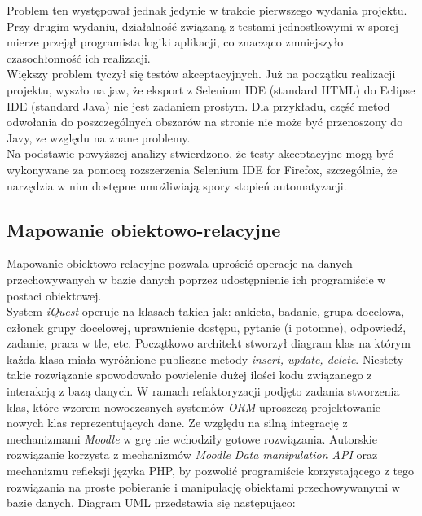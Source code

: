 Problem ten występował jednak jedynie w trakcie pierwszego wydania projektu. Przy drugim wydaniu, działalność związaną z testami jednostkowymi w sporej mierze przejął programista logiki aplikacji, co znacząco zmniejszyło czasochłonność ich realizacji. \\

Większy problem tyczył się testów akceptacyjnych. Już na początku realizacji projektu, wyszło na jaw, że eksport z Selenium IDE (standard HTML) do Eclipse IDE (standard Java) nie jest zadaniem prostym. Dla przykładu, część metod odwołania do poszczególnych obszarów na stronie nie może być przenoszony do Javy, ze względu na znane problemy. \\

Na podstawie powyższej analizy stwierdzono, że testy akceptacyjne mogą być wykonywane za pomocą rozszerzenia Selenium IDE for Firefox, szczególnie, że narzędzia w nim dostępne umożliwiają spory stopień automatyzacji.

\subsection{Mapowanie obiektowo-relacyjne}
\label{Chapter62c}

Mapowanie obiektowo-relacyjne pozwala uprościć operacje na danych przechowywanych w bazie danych poprzez udostępnienie ich programiście w postaci obiektowej. \\

System \emph{iQuest} operuje na klasach takich jak: ankieta, badanie, grupa docelowa, członek grupy docelowej, uprawnienie dostępu, pytanie (i potomne), odpowiedź, zadanie, praca w tle, etc. Początkowo architekt stworzył diagram klas na którym każda klasa miała wyróżnione publiczne metody \emph{insert, update, delete}. Niestety takie rozwiązanie spowodowało powielenie dużej ilości kodu związanego z interakcją z bazą danych. W ramach refaktoryzacji podjęto zadania stworzenia klas, które wzorem nowoczesnych systemów \emph{ORM} uproszczą projektowanie nowych klas reprezentujących dane. Ze względu na silną integrację z mechanizmami \emph{Moodle} w grę nie wchodziły gotowe rozwiązania. Autorskie rozwiązanie korzysta z mechanizmów \emph{Moodle Data manipulation API} oraz mechanizmu refleksji języka PHP, by pozwolić programiście korzystającego z tego rozwiązania na proste pobieranie i manipulację obiektami przechowywanymi w bazie danych. Diagram UML przedstawia się następująco:

